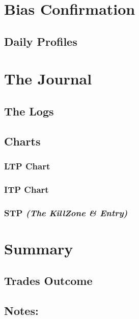 \documentclass{article}
\begin{document}
\section{Bias Confirmation}
\subsection{Daily Profiles}


\newpage
\section{The Journal} 
\subsection{The Logs}

\subsection{Charts}
\subsubsection{LTP Chart}
\subsubsection{ITP Chart}
\subsubsection{STP \textit{(The KillZone \& Entry)}}

\newpage
\section{Summary}
\subsection{Trades Outcome}
\subsection{Notes:}

\end{document}
